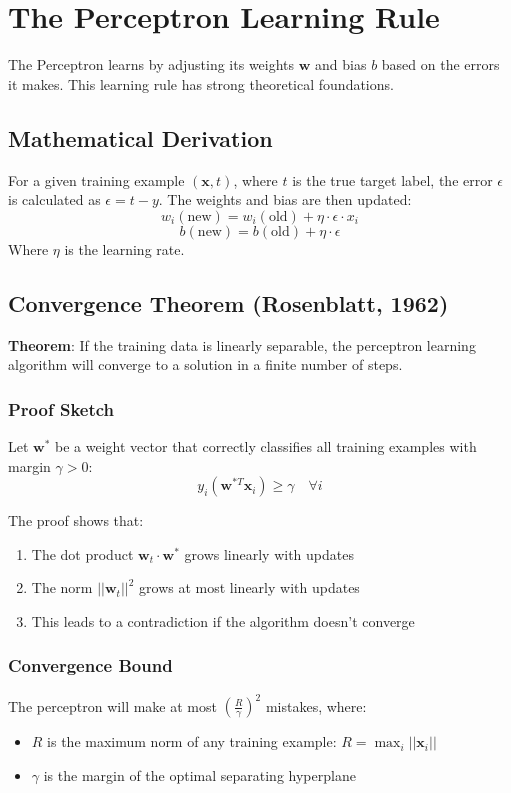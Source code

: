 \section{The Perceptron Learning Rule}
The Perceptron learns by adjusting its weights \(\mathbf{w}\) and bias \(b\) based on the errors it makes. This learning rule has strong theoretical foundations.

\subsection{Mathematical Derivation}
For a given training example \((\mathbf{x}, t)\), where \(t\) is the true target label, the error \(\epsilon\) is calculated as \(\epsilon = t - y\). The weights and bias are then updated:
\[ w_i(\text{new}) = w_i(\text{old}) + \eta \cdot \epsilon \cdot x_i \]
\[ b(\text{new}) = b(\text{old}) + \eta \cdot \epsilon \]
Where \(\eta\) is the learning rate.

\subsection{Convergence Theorem (Rosenblatt, 1962)}
\textbf{Theorem}: If the training data is linearly separable, the perceptron learning algorithm will converge to a solution in a finite number of steps.

\subsubsection{Proof Sketch}
Let \(\mathbf{w}^*\) be a weight vector that correctly classifies all training examples with margin \(\gamma > 0\):
\[y_i(\mathbf{w}^{*T} \mathbf{x}_i) \geq \gamma \quad \forall i\]

The proof shows that:
\begin{enumerate}
    \item The dot product \(\mathbf{w}_t \cdot \mathbf{w}^*\) grows linearly with updates
    \item The norm \(||\mathbf{w}_t||^2\) grows at most linearly with updates
    \item This leads to a contradiction if the algorithm doesn't converge
\end{enumerate}

\subsubsection{Convergence Bound}
The perceptron will make at most \(\left(\frac{R}{\gamma}\right)^2\) mistakes, where:
\begin{itemize}
    \item \(R\) is the maximum norm of any training example: \(R = \max_i ||\mathbf{x}_i||\)
    \item \(\gamma\) is the margin of the optimal separating hyperplane
\end{itemize}

